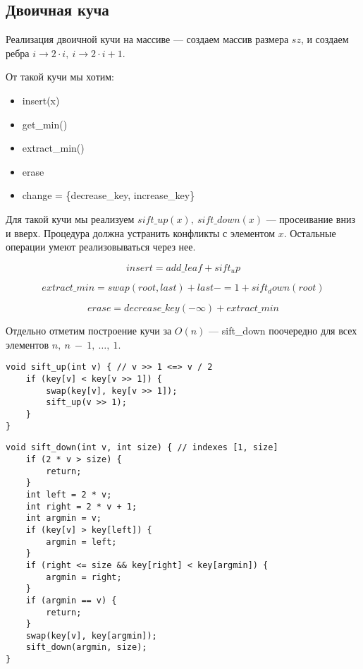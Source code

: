 \documentclass[12pt]{article}
\begin{document}
\subsection{Двоичная куча}

Реализация двоичной кучи на массиве --- создаем массив размера $sz$, и создаем ребра $i \rightarrow 2 \cdot i,\ i \rightarrow 2 \cdot i + 1$.

От такой кучи мы хотим:
\begin{itemize}
\item insert(x)
\item get\_min()
\item extract\_min()
\item erase
\item change = \{decrease\_key, increase\_key\}
\end{itemize}

Для такой кучи мы реализуем $sift\_up(x),\ sift\_down(x)$ --- просеивание вниз и вверх. Процедура должна устранить конфликты с элементом $x$. Остальные операции умеют реализовываться через нее. 

$$insert = add\_leaf + sift_up$$

$$extract\_min = swap(root, last) + last -= 1 + sift_down(root)$$

$$erase = decrease\_key(-\infty) + extract\_min$$

Отдельно отметим построение кучи за $O(n)$ --- sift\_down поочередно для всех элементов $n,~n~-~1,~\dots,~1$.

\begin{verbatim}
void sift_up(int v) { // v >> 1 <=> v / 2
    if (key[v] < key[v >> 1]) {
        swap(key[v], key[v >> 1]);
        sift_up(v >> 1);
    }
}
\end{verbatim} 

\begin{verbatim}
void sift_down(int v, int size) { // indexes [1, size]
    if (2 * v > size) {
        return;
    }
    int left = 2 * v;
    int right = 2 * v + 1;
    int argmin = v;
    if (key[v] > key[left]) {
        argmin = left;
    }
    if (right <= size && key[right] < key[argmin]) {
        argmin = right;
    }
    if (argmin == v) {
        return;
    }
    swap(key[v], key[argmin]);
    sift_down(argmin, size);
}
\end{verbatim}
\end{document}
